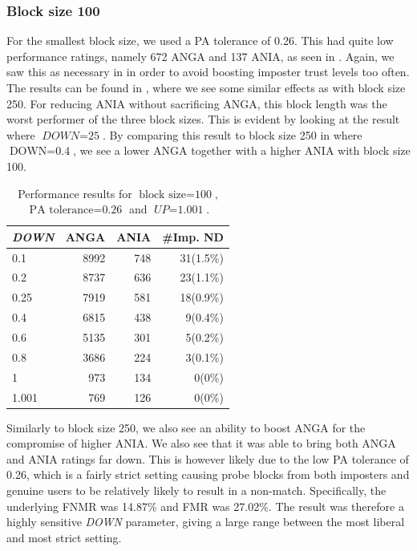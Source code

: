 \subsubsection{Block size 100}
For the smallest block size, we used a PA tolerance of 0.26.
This had quite low performance ratings, namely 672 ANGA and 137 ANIA, as seen in .
Again, we saw this as necessary in in order to avoid boosting imposter trust levels too often.
The results can be found in , where we see some similar effects as with block size 250.
For reducing ANIA without sacrificing ANGA, this block length was the worst performer of the three block sizes.
This is evident by looking at the result where $\textit{DOWN} = \text{25}$.
By comparing this result to block size 250 in  where $\text{DOWN} = \text{0.4}$, we see a lower ANGA together with a higher ANIA with block size 100.

\begin{table}[ht]
\centering
\begin{tabular}{lrrr}
\hline
\textit{DOWN} & ANGA  & ANIA & \#Imp. ND \\ \hline
0.1   & 8992 & 748 & 31(1.5\%) \\
0.2   & 8737 & 636 & 23(1.1\%) \\
0.25  & 7919 & 581 & 18(0.9\%) \\
0.4   & 6815 & 438 & 9(0.4\%)  \\
0.6   & 5135 & 301 & 5(0.2\%)  \\
0.8   & 3686 & 224 & 3(0.1\%)  \\
1     & 973  & 134 & 0(0\%)    \\
1.001 & 769  & 126 & 0(0\%)  
\end{tabular}
\caption{Performance results for $\text{block size} = \text{100}$, $\text{PA tolerance} = \text{0.26}$ and $\textit{UP} = \text{1.001}$.}
\label{tab:decision-level-BL100}
\end{table}

Similarly to block size 250, we also see an ability to boost ANGA for the compromise of higher ANIA.
We also see that it was able to bring both ANGA and ANIA ratings far down.
This is however likely due to the low PA tolerance of 0.26, which is a fairly strict setting causing probe blocks from both imposters and genuine users to be relatively likely to result in a non-match. 
Specifically, the underlying FNMR was 14.87\% and FMR was 27.02\%.
The result was therefore a highly sensitive \textit{DOWN} parameter, giving a large range between the most liberal and most strict setting.

